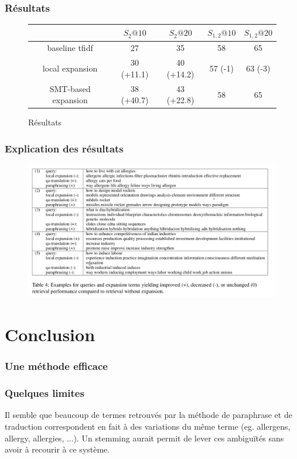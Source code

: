 \documentclass[10pt]{beamer}
\begin{document}
\begin{frame}
  \frametitle{Résultats}
  \begin{figure}[h]
    \centering
    \begin{tabular}[h]{|c|c|c|c|c|}
    \hline
    & $S_2@10$ & $S_2@20$ & $S_{1,2}@10$ & $S_{1,2}@20$\\
    \hline
    baseline tfidf & 27 & 35 & 58 & 65\\
    local expansion & 30 (+11.1) & 40 (+14.2) & 57 (-1) & 63 (-3)\\
    SMT-based expansion & 38 (+40.7) & 43 (+22.8) & 58 & 65\\
    \hline
  \end{tabular}

    \caption{Résultats}
    \label{fig:res}
  \end{figure}

\end{frame}

\begin{frame}
  \frametitle{Explication des résultats}

  \begin{figure}[h]
    \centering
    \includegraphics[width=\textwidth]{table4}
    \label{fig:res}
  \end{figure}
\end{frame}

\section{Conclusion}
\label{sec:conclusion}


\begin{frame}
  \frametitle{Une méthode efficace}
\end{frame}

\begin{frame}
  \frametitle{Quelques limites}
  Il semble que beaucoup de termes retrouvés par la méthode de
  paraphrase et de traduction correspondent en fait à des variations
  du même terme (eg. allergens, allergy, allergies, ...). Un stemming
  aurait permit de lever ces ambiguïtés sans avoir à recourir à ce système.
\end{frame}
\end{document}
